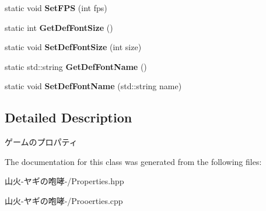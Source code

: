 \begin{DoxyCompactItemize}
\item 
static void {\bfseries Set\+F\+PS} (int fps)\hypertarget{class_properties_acbc69eeef60bbcb0cea46961cc54ba98}{}\label{class_properties_acbc69eeef60bbcb0cea46961cc54ba98}

\item 
static int {\bfseries Get\+Def\+Font\+Size} ()\hypertarget{class_properties_aa57e1fd19a2dda21d4913b45d5c26f1e}{}\label{class_properties_aa57e1fd19a2dda21d4913b45d5c26f1e}

\item 
static void {\bfseries Set\+Def\+Font\+Size} (int size)\hypertarget{class_properties_ab97b079cd36f8fd8c6fc8d50f0e60997}{}\label{class_properties_ab97b079cd36f8fd8c6fc8d50f0e60997}

\item 
static std\+::string {\bfseries Get\+Def\+Font\+Name} ()\hypertarget{class_properties_adddc8b82b168a35708e45faf0e823fa3}{}\label{class_properties_adddc8b82b168a35708e45faf0e823fa3}

\item 
static void {\bfseries Set\+Def\+Font\+Name} (std\+::string name)\hypertarget{class_properties_ac2c1ce82f485762e19aa28d25e241d4e}{}\label{class_properties_ac2c1ce82f485762e19aa28d25e241d4e}

\end{DoxyCompactItemize}


\subsection{Detailed Description}
ゲームのプロパティ 

The documentation for this class was generated from the following files\+:\begin{DoxyCompactItemize}
\item 
山火-\/ヤギの咆哮-\//Properties.\+hpp\item 
山火-\/ヤギの咆哮-\//Prooerties.\+cpp\end{DoxyCompactItemize}
